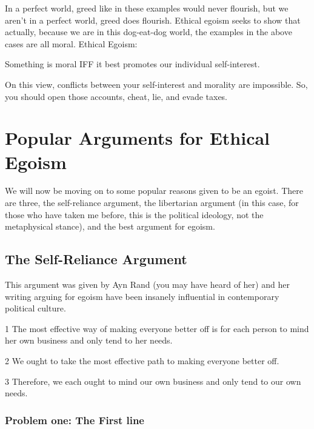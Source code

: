 
In a perfect world, greed like in these examples would never flourish, but we aren’t in a perfect world, greed does flourish. Ethical egoism seeks to show that actually, because we are in this dog-eat-dog world, the examples in the above cases are all moral. Ethical Egoism:
\begin{center}
Something is moral IFF it best promotes our individual self-interest.
\end{center}
On this view, conflicts between your self-interest and morality are impossible. So, you should open those accounts, cheat, lie, and evade taxes.

\section{Popular Arguments for Ethical Egoism}

We will now be moving on to some popular reasons given to be an egoist. There are three, the self-reliance argument, the libertarian argument (in this case, for those who have taken me before, this is the political ideology, not the metaphysical stance), and the best argument for egoism.

\subsection{The Self-Reliance Argument}

This argument was given by Ayn Rand (you may have heard of her) and her writing arguing for egoism have been insanely influential in contemporary political culture.

\begin{earg}
\item[1] The most effective way of making everyone better off is for each person to mind her own business and only tend to her needs.
\item[2] We ought to take the most effective path to making everyone better off.
\item[3] Therefore, we each ought to mind our own business and only tend to our own needs.
\end{earg}

\subsubsection{Problem one: The First line}


